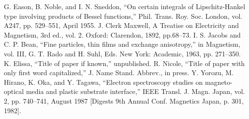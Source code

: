 \documentclass[conference]{IEEEtran}
\begin{document}
\begin{thebibliography}{99}
 G. Eason, B. Noble, and I. N. Sneddon, ``On certain integrals of Lipschitz-Hankel type involving products of Bessel functions,'' Phil. Trans. Roy. Soc. London, vol. A247, pp. 529--551, April 1955.
 J. Clerk Maxwell, A Treatise on Electricity and Magnetism, 3rd ed., vol. 2. Oxford: Clarendon, 1892, pp.68--73.
 I. S. Jacobs and C. P. Bean, ``Fine particles, thin films and exchange anisotropy,'' in Magnetism, vol. III, G. T. Rado and H. Suhl, Eds. New York: Academic, 1963, pp. 271--350.
 K. Elissa, ``Title of paper if known,'' unpublished.
 R. Nicole, ``Title of paper with only first word capitalized,'' J. Name Stand. Abbrev., in press.
 Y. Yorozu, M. Hirano, K. Oka, and Y. Tagawa, ``Electron spectroscopy studies on magneto-optical media and plastic substrate interface,'' IEEE Transl. J. Magn. Japan, vol. 2, pp. 740--741, August 1987 [Digests 9th Annual Conf. Magnetics Japan, p. 301, 1982].
\end{thebibliography}
\end{document}
